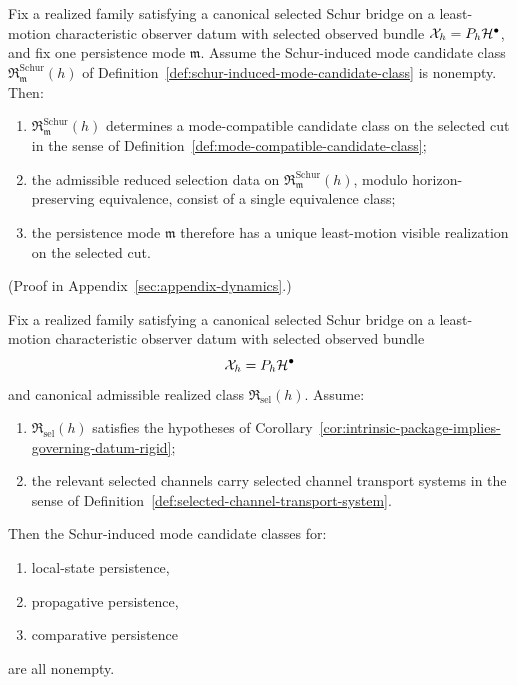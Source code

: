 \begin{theorem}
\label{thm:nonempty-schur-induced-mode-classes-have-singleton-reduced-selection}
Fix a realized family satisfying a canonical selected Schur bridge on a
least-motion characteristic observer datum with selected observed bundle
\(\mathcal X_h=P_h\mathcal{H}^\bullet\), and fix one persistence mode
\(\mathfrak m\). Assume the Schur-induced mode candidate class
\(\mathfrak R^{\mathrm{Schur}}_{\mathfrak m}(h)\) of
Definition~\ref{def:schur-induced-mode-candidate-class} is nonempty. Then:
\begin{enumerate}[label=(\roman*), leftmargin=2em, itemsep=0.2em]
\item \(\mathfrak R^{\mathrm{Schur}}_{\mathfrak m}(h)\) determines a
      mode-compatible candidate class on the selected cut in the sense of
      Definition~\ref{def:mode-compatible-candidate-class};
\item the admissible reduced selection data on
      \(\mathfrak R^{\mathrm{Schur}}_{\mathfrak m}(h)\), modulo
      horizon-preserving equivalence, consist of a single equivalence class;
\item the persistence mode \(\mathfrak m\) therefore has a unique least-motion
      visible realization on the selected cut.
\end{enumerate}
\end{theorem}

(Proof in Appendix~\ref{sec:appendix-dynamics}.)

\begin{theorem}
\label{thm:intrinsic-selected-channel-package-forces-three-schur-mode-classes}
Fix a realized family satisfying a canonical selected Schur bridge on a
least-motion characteristic observer datum with selected observed bundle
\[
\mathcal X_h=P_h\mathcal{H}^\bullet
\]
and canonical admissible realized class \(\mathfrak R_{\mathrm{sel}}(h)\).
Assume:
\begin{enumerate}[label=(\roman*), leftmargin=2em, itemsep=0.2em]
\item \(\mathfrak R_{\mathrm{sel}}(h)\) satisfies the hypotheses of
      Corollary~\ref{cor:intrinsic-package-implies-governing-datum-rigid};
\item the relevant selected channels carry selected channel transport systems
      in the sense of Definition~\ref{def:selected-channel-transport-system}.
\end{enumerate}
Then the Schur-induced mode candidate classes for:
\begin{enumerate}[label=(\alph*), leftmargin=2em, itemsep=0.2em]
\item local-state persistence,
\item propagative persistence,
\item comparative persistence
\end{enumerate}
are all nonempty.
\end{theorem}

